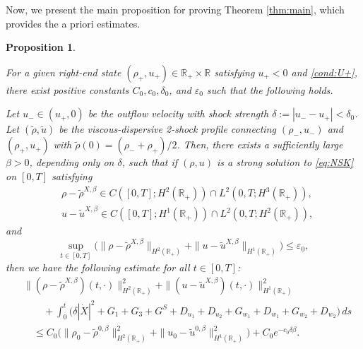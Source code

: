\documentclass[11pt,reqno]{amsart}
\newtheorem{proposition}{Proposition}[section]
\numberwithin{equation}{section} %
\newcommand{\e}{\varepsilon}
\begin{document}
Now, we present the main proposition for proving Theorem \ref{thm:main}, which provides the a priori estimates.

\begin{proposition}\label{prop:apriori}

    For a given right-end state $(\rho_+, u_+) \in \mathbb{R}_+ \times \mathbb{R}$ satisfying $u_+<0$ and \eqref{cond:U+}, there exist positive constants $C_0, c_0, \delta_0$, and $\e_0$ such that the following holds.
    
    Let $u_- \in (u_+, 0)$ be the outflow velocity with shock strength $\delta := |u_- - u_+| < \delta_0$. Let $(\tilde{\rho}, \tilde{u})$ be the viscous-dispersive 2-shock profile connecting $(\rho_-, u_-)$ and $(\rho_+, u_+)$ with $\tilde{\rho}(0) = (\rho_- + \rho_+)/2$. Then, there exists a sufficiently large $\beta>0$, depending only on $\delta$, such that if $(\rho, u)$ is a strong solution to \eqref{eq:NSK} on $[0,T]$ satisfying
    \begin{equation*}
    \begin{aligned}
    &\rho - \tilde{\rho}^{X, \beta} \in C([0,T];H^2(\mathbb{R}_+)) \cap L^2(0,T;H^3(\mathbb{R}_+)),\\
    &u - \tilde{u}^{X, \beta} \in C([0,T];H^1(\mathbb{R}_+)) \cap L^2(0,T;H^2(\mathbb{R}_+)),
    \end{aligned} 
    \end{equation*}
    and
    \begin{equation}\label{p-assum}
    \sup_{t \in [0,T]} \Big( \| \rho - \tilde{\rho}^{X, \beta} \|_{H^2(\mathbb{R}_+)} + \| u - \tilde{u}^{X, \beta} \|_{H^1(\mathbb{R}_+)} \Big) \leq \e_0,
    \end{equation}
    then we have the following estimate for all $t \in [0, T]$:
    \begin{equation*}%
    \begin{aligned}
    & \|(\rho - \tilde{\rho}^{X, \beta})(t,\cdot
    )\|_{H^2(\mathbb{R}_+)}^2 + \| (u - \tilde{u}^{X, \beta})(t,\cdot) \|_{H^1(\mathbb{R}_+)}^2 \\
    &\qquad + \int_0^t \Big( \delta |\dot{X}|^2 + G_1 + G_3 + G^S + D_{u_1} + D_{u_2} + G_{w_1} + D_{w_1} + G_{w_2} + D_{w_2} \Big)\,ds\\
    &\quad \leq C_0 \Big( \| \rho_0 - \tilde{\rho}^{0,\beta} \|_{H^2(\mathbb{R}_+)}^2 + \| u_0 - \tilde{u}^{0,\beta} \|_{H^1(\mathbb{R}_+)}^2 \Big) + C_0 e^{-c_0 \delta \beta}.
    \end{aligned} 
    \end{equation*}

\end{proposition}
\end{document}
